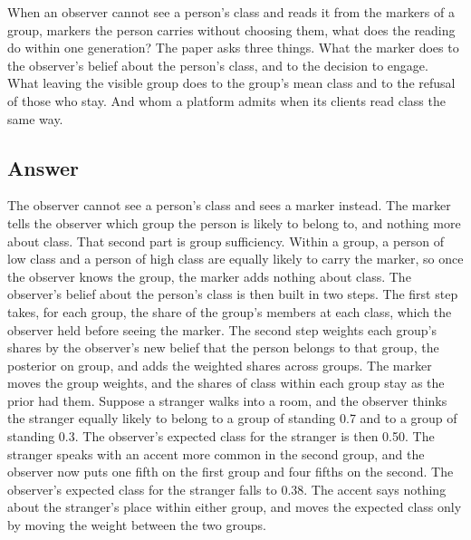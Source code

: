 When an observer cannot see a person's class and reads it from the markers
of a group, markers the person carries without choosing them, what does the
reading do within one generation? The paper asks
three things. What the marker does to the observer's belief about the
person's class, and to the decision to engage. What leaving the visible group does to the group's mean
class and to the refusal of those who stay. And whom a platform admits when
its clients read class the same way.

\subsection{Answer}

The observer cannot see a person's class and sees a marker instead. The
marker tells the observer which group the person is likely to belong to,
and nothing more about class. That second part is group sufficiency.
Within a group, a person of low class and a person of high class are
equally likely to carry the marker, so once the observer knows the group,
the marker adds nothing about class. The observer's belief about the
person's class is then built in two steps. The first step takes, for each
group, the share of the group's members at each class, which the observer
held before seeing the marker. The second step weights each group's shares
by the observer's new belief that the person belongs to that group, the
posterior on group, and adds the weighted shares across groups. The marker
moves the group weights, and the shares of class within each group stay as
the prior had them. Suppose a stranger walks into a room, and the observer
thinks the stranger equally likely to belong to a group of standing 0.7 and
to a group of standing 0.3. The observer's expected class for the stranger
is then 0.50. The stranger speaks with an accent more common in the second
group, and the observer now puts one fifth on the first group and four
fifths on the second. The observer's expected class for the stranger falls
to 0.38. The accent says nothing about the stranger's place within either
group, and moves the expected class only by moving the weight between the
two groups.


